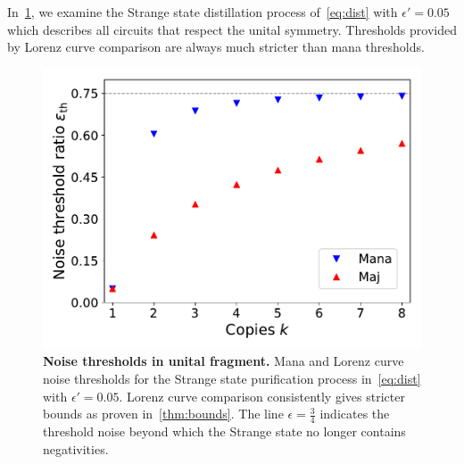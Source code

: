 \documentclass[pra,
aps,
twocolumn,
superscriptaddress,
groupedaddress,
nofootinbib,
reprint
]{revtex4-1}
\begin{document}
In~\cref{fig:unital_distill}, we examine the Strange state distillation process of~\cref{eq:dist} with $\epsilon' = 0.05$ which describes all circuits that respect the unital symmetry.
Thresholds provided by Lorenz curve comparison are always much stricter than mana thresholds.
\begin{figure}[h]
    \centering
    \includegraphics[scale=0.5]{figs/unital_distill.pdf}
    \caption{\textbf{Noise thresholds in unital fragment.} Mana and Lorenz curve noise thresholds for the Strange state purification process in~\cref{eq:dist} with $\epsilon' = 0.05$.
    Lorenz curve comparison consistently gives stricter bounds as proven in~\cref{thm:bounds}.
    The line $\epsilon = \frac{3}{4}$ indicates the threshold noise beyond which the Strange state no longer contains negativities. 
    }
    \label{fig:unital_distill}
\end{figure}
\end{document}
